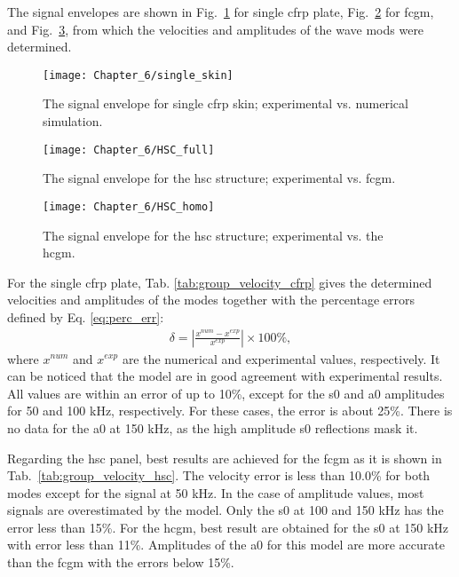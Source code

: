 The signal envelopes are shown in Fig.~\ref{fig:single_skin} for single \ac{cfrp} plate, Fig.~\ref{fig:hsc_full} for \ac{fcgm}, and Fig.~\ref{fig:hsc_homo}, from which the velocities and amplitudes of the wave mods were determined.
\begin{figure}[H]
	\begin{center}
		\texttt{[image: Chapter\_6/single\_skin]}
	\end{center}
	\caption{The signal envelope for single \acf{cfrp} skin; experimental vs. numerical simulation.}
	\label{fig:single_skin}
\end{figure}
\begin{figure}[H]
	\begin{center}
		\texttt{[image: Chapter\_6/HSC\_full]}
	\end{center}
	\caption{The signal envelope for the \acf{hsc} structure; experimental vs. \acf{fcgm}.}
	\label{fig:hsc_full}
\end{figure}
\begin{figure}[H]
	\begin{center}
		\texttt{[image: Chapter\_6/HSC\_homo]}
	\end{center}
	\caption{The signal envelope for the \acf{hsc} structure; experimental vs. the \acf{hcgm}.}
	\label{fig:hsc_homo}
\end{figure}

For the single \ac{cfrp} plate, Tab. \ref{tab:group_velocity_cfrp} gives the determined velocities and amplitudes of the modes together with the percentage errors defined by Eq. \ref{eq:perc_err}:
\begin{eqnarray}
	\delta = \left|\frac{x^{num}-x^{exp}}{x^{exp}}\right|\times100\%,
	\label{eq:perc_err}
\end{eqnarray}
%
where \(x^{num}\) and \(x^{exp}\) are the numerical and experimental values, respectively.
It can be noticed that the model are in good agreement with experimental results.
All values are within an error of up to 10\%, except for the \ac{s0} and \ac{a0} amplitudes for 50 and 100 \unit{\kHz}, respectively.
For these cases, the error is about 25\%.
There is no data for the \ac{a0} at 150 \unit{\kHz}, as the high amplitude \ac{s0} reflections mask it.

Regarding the \ac{hsc} panel, best results are achieved for the \ac{fcgm} as it is shown in Tab.~\ref{tab:group_velocity_hsc}.
The velocity error is less than 10.0\% for both modes except for the signal at 50 \unit{\kHz}. 
In the case of amplitude values, most signals are overestimated by the model. Only the \ac{s0} at 100 and 150 \unit{\kHz} has the error less than 15\%.
For the \ac{hcgm}, best result are obtained for the \ac{s0} at 150 \unit{\kHz} with error less than 11\%.
Amplitudes of the \ac{a0} for this model are more accurate than the \ac{fcgm} with the errors below 15\%.

